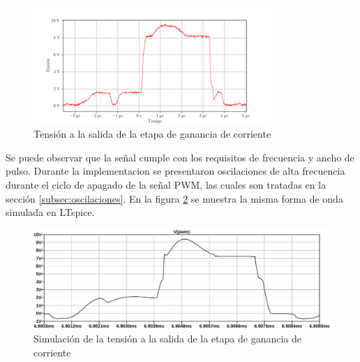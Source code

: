 \begin{figure}[H]
    \centering
    \includegraphics[width=0.8\textwidth]{images/capturas-osciloscopio/17-11-2022/1.png}
    \caption{Tensión a la salida de la etapa de ganancia de corriente}
    \label{fig:osc_pwm_vout_disconnected}
\end{figure}


Se puede observar que la señal cumple con los requisitos de frecuencia y ancho de pulso.
Durante la implementacion se presentaron oscilaciones de alta frecuencia durante el ciclo de apagado de la señal PWM, las cuales son tratadas en la sección \ref{subsec:oscilaciones}.
En la figura \ref{fig:sim:osc_pwm_vout} se muestra la misma forma de onda simulada en LTspice.

\begin{figure}[H]
    \centering
    \includegraphics[width=\textwidth]{images/sim/3.pdf}
    \caption{Simulación de la tensión a la salida de la etapa de ganancia de corriente}
    \label{fig:sim:osc_pwm_vout}
\end{figure}

